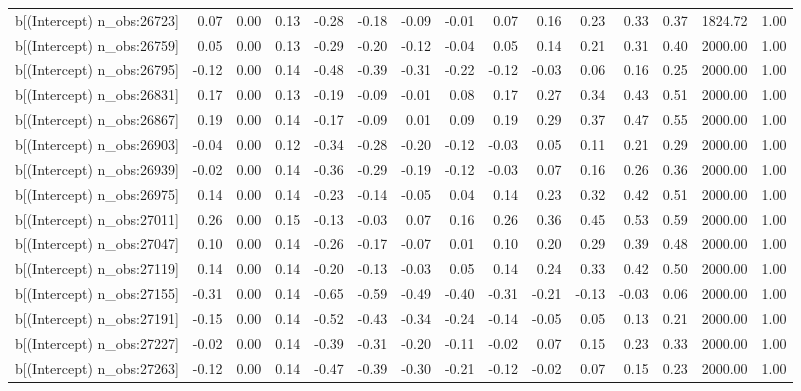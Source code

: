 \begin{table}[ht]
\begin{tabular}{rrrrrrrrrrrrrrr}
  b[(Intercept) n\_obs:26723] & 0.07 & 0.00 & 0.13 & -0.28 & -0.18 & -0.09 & -0.01 & 0.07 & 0.16 & 0.23 & 0.33 & 0.37 & 1824.72 & 1.00 \\ 
  b[(Intercept) n\_obs:26759] & 0.05 & 0.00 & 0.13 & -0.29 & -0.20 & -0.12 & -0.04 & 0.05 & 0.14 & 0.21 & 0.31 & 0.40 & 2000.00 & 1.00 \\ 
  b[(Intercept) n\_obs:26795] & -0.12 & 0.00 & 0.14 & -0.48 & -0.39 & -0.31 & -0.22 & -0.12 & -0.03 & 0.06 & 0.16 & 0.25 & 2000.00 & 1.00 \\ 
  b[(Intercept) n\_obs:26831] & 0.17 & 0.00 & 0.13 & -0.19 & -0.09 & -0.01 & 0.08 & 0.17 & 0.27 & 0.34 & 0.43 & 0.51 & 2000.00 & 1.00 \\ 
  b[(Intercept) n\_obs:26867] & 0.19 & 0.00 & 0.14 & -0.17 & -0.09 & 0.01 & 0.09 & 0.19 & 0.29 & 0.37 & 0.47 & 0.55 & 2000.00 & 1.00 \\ 
  b[(Intercept) n\_obs:26903] & -0.04 & 0.00 & 0.12 & -0.34 & -0.28 & -0.20 & -0.12 & -0.03 & 0.05 & 0.11 & 0.21 & 0.29 & 2000.00 & 1.00 \\ 
  b[(Intercept) n\_obs:26939] & -0.02 & 0.00 & 0.14 & -0.36 & -0.29 & -0.19 & -0.12 & -0.03 & 0.07 & 0.16 & 0.26 & 0.36 & 2000.00 & 1.00 \\ 
  b[(Intercept) n\_obs:26975] & 0.14 & 0.00 & 0.14 & -0.23 & -0.14 & -0.05 & 0.04 & 0.14 & 0.23 & 0.32 & 0.42 & 0.51 & 2000.00 & 1.00 \\ 
  b[(Intercept) n\_obs:27011] & 0.26 & 0.00 & 0.15 & -0.13 & -0.03 & 0.07 & 0.16 & 0.26 & 0.36 & 0.45 & 0.53 & 0.59 & 2000.00 & 1.00 \\ 
  b[(Intercept) n\_obs:27047] & 0.10 & 0.00 & 0.14 & -0.26 & -0.17 & -0.07 & 0.01 & 0.10 & 0.20 & 0.29 & 0.39 & 0.48 & 2000.00 & 1.00 \\ 
  b[(Intercept) n\_obs:27119] & 0.14 & 0.00 & 0.14 & -0.20 & -0.13 & -0.03 & 0.05 & 0.14 & 0.24 & 0.33 & 0.42 & 0.50 & 2000.00 & 1.00 \\ 
  b[(Intercept) n\_obs:27155] & -0.31 & 0.00 & 0.14 & -0.65 & -0.59 & -0.49 & -0.40 & -0.31 & -0.21 & -0.13 & -0.03 & 0.06 & 2000.00 & 1.00 \\ 
  b[(Intercept) n\_obs:27191] & -0.15 & 0.00 & 0.14 & -0.52 & -0.43 & -0.34 & -0.24 & -0.14 & -0.05 & 0.05 & 0.13 & 0.21 & 2000.00 & 1.00 \\ 
  b[(Intercept) n\_obs:27227] & -0.02 & 0.00 & 0.14 & -0.39 & -0.31 & -0.20 & -0.11 & -0.02 & 0.07 & 0.15 & 0.23 & 0.33 & 2000.00 & 1.00 \\ 
  b[(Intercept) n\_obs:27263] & -0.12 & 0.00 & 0.14 & -0.47 & -0.39 & -0.30 & -0.21 & -0.12 & -0.02 & 0.07 & 0.15 & 0.23 & 2000.00 & 1.00 \\ 

\end{tabular}
\end{table}
